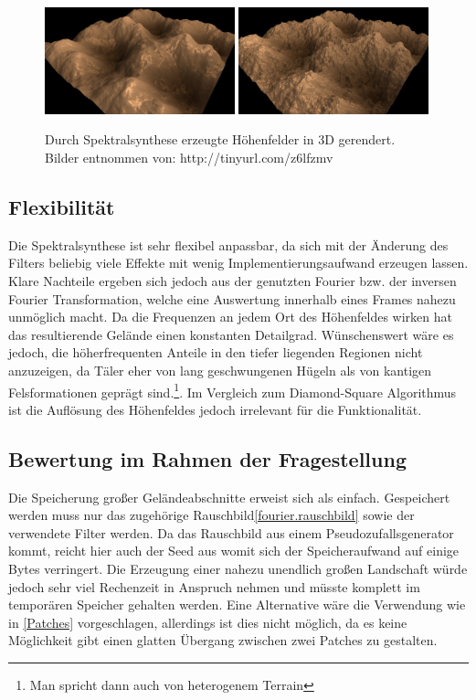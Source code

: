 \begin{figure}
	\centering
	{\includegraphics[width=0.49\textwidth]{images/fourier_24.jpg}}
	 {\includegraphics[width=0.49\textwidth]{images/fourier_20.jpg}}
	\caption{Durch Spektralsynthese erzeugte Höhenfelder in 3D gerendert. Bilder entnommen von: http://tinyurl.com/z6lfzmv}\label{img.fourierResult}
\end{figure}\label{test}

\subsection{Flexibilität}
Die Spektralsynthese ist sehr flexibel anpassbar, da sich mit der Änderung des Filters beliebig viele Effekte mit wenig Implementierungsaufwand erzeugen lassen. Klare Nachteile ergeben sich jedoch aus der genutzten Fourier bzw. der inversen Fourier Transformation, welche eine Auswertung innerhalb eines Frames nahezu unmöglich macht. Da die Frequenzen an jedem Ort des Höhenfeldes wirken hat das resultierende Gelände einen konstanten Detailgrad. Wünschenswert wäre es jedoch, die höherfrequenten Anteile in den tiefer liegenden Regionen nicht anzuzeigen, da Täler eher von lang geschwungenen Hügeln als von kantigen Felsformationen geprägt sind.\label{unisotrop}\footnote{Man spricht dann auch von heterogenem Terrain}. Im Vergleich zum Diamond-Square Algorithmus ist die Auflösung des Höhenfeldes jedoch irrelevant für die Funktionalität.

\subsection{Bewertung im Rahmen der Fragestellung}
Die Speicherung großer Geländeabschnitte erweist sich als einfach. Gespeichert werden muss nur das zugehörige Rauschbild\ref{fourier.rauschbild} sowie der verwendete Filter werden. Da das Rauschbild aus einem Pseudozufallsgenerator kommt, reicht hier auch der Seed aus womit sich der Speicheraufwand auf einige Bytes verringert.
Die Erzeugung einer nahezu unendlich großen Landschaft würde jedoch sehr viel Rechenzeit in Anspruch nehmen und müsste komplett im temporären Speicher gehalten werden. Eine Alternative wäre die Verwendung wie in \ref{Patches} vorgeschlagen, allerdings ist dies nicht möglich, da es keine Möglichkeit gibt einen glatten Übergang zwischen zwei Patches zu gestalten.